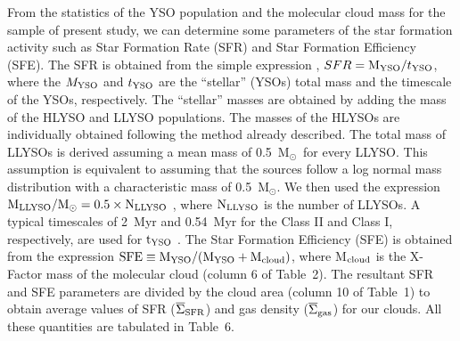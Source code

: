 \documentclass[iop]{emulateapj}
\newcommand{\msun}{M$_{\odot}$}
\newcommand{\sigsfrav}{$\overline\Sigma_{\rm SFR}$}
\newcommand{\siggasav}{$\overline\Sigma_{\rm gas}$}
\begin{document}
From the statistics of the YSO population and the molecular cloud mass
for the sample of present study,  we can determine some parameters of
the star formation activity such as Star Formation Rate (SFR) and Star
Formation Efficiency (SFE). The SFR is obtained from the simple
expression \citep{evans+09}, $SFR={\rm M}_{\rm YSO} / t_{\rm YSO}$, 
where the $M_{\rm YSO}$ and $t_{\rm YSO}$ are the ``stellar'' (YSOs) total 
mass and the timescale of the YSOs, respectively. The ``stellar'' 
masses are obtained by adding the mass of the HLYSO and LLYSO populations. 
The masses of the HLYSOs are individually obtained following the method
already described.
The total mass of LLYSOs is derived assuming a mean mass of 0.5~\msun\ for every
LLYSO. This assumption is equivalent to assuming that the sources follow 
a log normal mass distribution with a characteristic mass of 0.5~\msun. 
We then used the expression $\rm M_{LLYSO}/{M_{\odot}}=0.5\times N_{LLYSO}$ 
\citep{evans+09}, where $\rm N_{LLYSO}$ is the number of LLYSOs. 
A typical timescales of 2~Myr and 0.54~Myr for the Class II and Class I, respectively, 
are used for $\rm t_{\rm YSO}$ \citep{evans+09}. 
The Star Formation Efficiency (SFE) is obtained from the expression 
${\rm SFE}\equiv{\rm M}_{\rm YSO}/({\rm M}_{\rm YSO}+{\rm M}_{\rm cloud})$,
where M$_{\rm cloud}$ is the X-Factor mass of the molecular cloud (column 6 of Table~2). 
The resultant SFR and SFE parameters are divided by the cloud area (column 10 of 
Table~1) to obtain average values of SFR (\sigsfrav) and %
gas density (\siggasav) %
for our clouds. All these quantities are tabulated in Table~6. 
\\
\\
\end{document}
